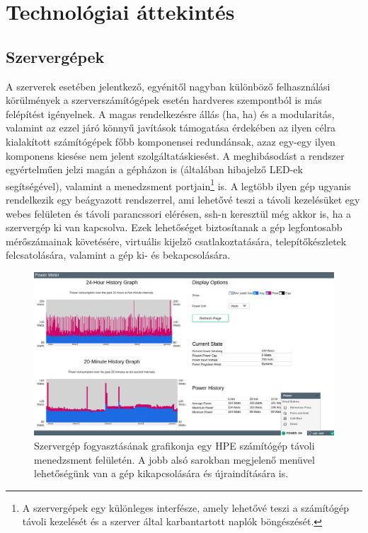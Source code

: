 
\chapter{Technológiai áttekintés}
\label{chap:technologies}

\section{Szervergépek}
\label{sect:servers}
A szerverek esetében jelentkező, egyénitől nagyban különböző felhasználási körülmények a szerverszámítógépek esetén hardveres szempontból is más felépítést igényelnek. A magas rendelkezésre állás (\acrlong{ha}, \acrshort{ha}) és a modularitás, valamint az ezzel járó könnyű javítások támogatása érdekében az ilyen célra kialakított számítógépek főbb komponensei redundánsak, azaz egy-egy ilyen komponens kiesése nem jelent szolgáltatáskiesést. A meghibásodást a rendszer egyértelműen jelzi magán a gépházon is (általában hibajelző LED-ek segítségével), valamint a menedzsment portjain\footnote{A szervergépek egy különleges interfésze, amely lehetővé teszi a számítógép távoli kezelését és a szerver által karbantartott naplók böngészését.} is. A legtöbb ilyen gép ugyanis rendelkezik egy beágyazott rendszerrel, ami lehetővé teszi a távoli kezelésüket egy webes felületen és távoli parancssori elérésen, \acrshort{ssh}-n keresztül még akkor is, ha a szervergép ki van kapcsolva. Ezek lehetőséget biztosítanak a gép legfontosabb mérőszámainak követésére, virtuális kijelző csatlakoztatására, telepítőkészletek felcsatolására, valamint a gép ki- és bekapcsolására.

\begin{figure}[!ht]
	\centering
	\includegraphics[width=150mm, keepaspectratio]{figures/ilo-power1.png}
	\caption{Szervergép fogyasztásának grafikonja egy HPE számítógép távoli menedzsment felületén. A jobb alsó sarokban megjelenő menüvel lehetőségünk van a gép kikapcsolására és újraindítására is.}
	\label{fig:ilopowerchart}
\end{figure}

